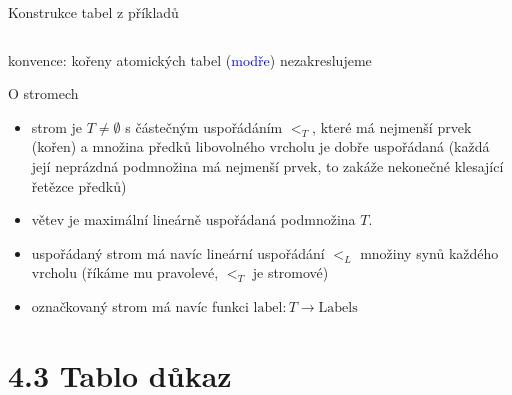 \documentclass{beamer}
\begin{document}
\begin{frame}{Konstrukce tabel z příkladů}
\begin{center}
{\begin{columns}
    \end{columns}

    }

    \pause
    \alert{konvence:} kořeny atomických tabel (\textcolor{blue}{modře}) nezakreslujeme   

    \end{center}    

\end{frame}


\begin{frame}{O stromech}
    
    \begin{itemize}
        \item \alert{strom} je $T\neq\emptyset$ s částečným uspořádáním $<_T$, které má nejmenší prvek (\alert{kořen}) a množina předků libovolného vrcholu je \alert{dobře uspořádaná} \pause(každá její neprázdná podmnožina má nejmenší prvek, to zakáže nekonečné klesající řetězce předků)\pause
        \item \alert{větev} je maximální lineárně uspořádaná podmnožina $T$.\pause
        \item \alert{uspořádaný strom} má navíc lineární uspořádání $<_L$ množiny synů každého vrcholu (říkáme mu \alert{pravolevé}, $<_T$ je \alert{stromové})\pause
        \item \alert{označkovaný strom} má navíc funkci $\mathrm{label}\colon T\to\mathrm{Labels}$        
    \end{itemize}

    \pause

\end{frame}


\section{4.3 Tablo důkaz}
\end{document}
